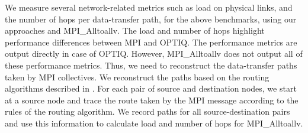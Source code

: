 
We measure several network-related metrics such as load on physical links, and the number of hops per data-transfer path, for the above benchmarks, using our approaches and MPI\_Alltoallv. The load and number of hops highlight performance differences between MPI and OPTIQ. The performance metrics are output directly in case of OPTIQ. However, MPI\_Alltoallv does not output all of these performance metrics. Thus, we need to reconstruct the data-transfer paths taken by MPI collectives. We reconstruct the paths based on the routing algorithms described in \cite{Chen:BGQ}. For each pair of source and destination nodes, we start at a source node and trace the route taken by the MPI message according to the rules of the routing algorithm. We record paths for all source-destination pairs and use this information to calculate load and number of hops for MPI\_Alltoallv. 

